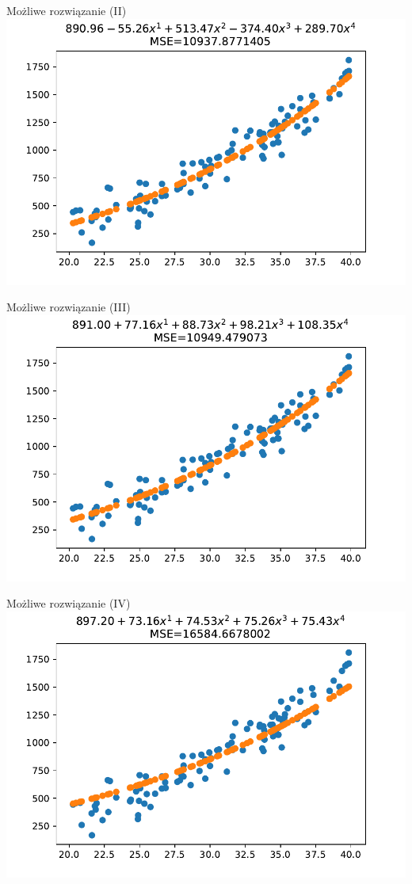 \documentclass{sa}
\begin{document}
\begin{frame}{Możliwe rozwiązanie (II)}
\includegraphics[width=\textwidth]{reg-2deg-with-noise-ridge0_001.pdf}
\end{frame}

\begin{frame}{Możliwe rozwiązanie (III)}
\includegraphics[width=\textwidth]{reg-2deg-with-noise-ridge1.pdf}
\end{frame}

\begin{frame}{Możliwe rozwiązanie (IV)}
\includegraphics[width=\textwidth]{reg-2deg-with-noise-ridge100.pdf}
\end{frame}
\end{document}
